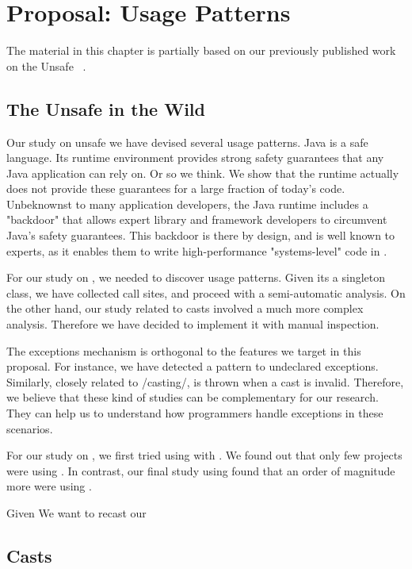 
\chapter{Proposal: Usage Patterns}

\label{cha:proposal}

The material in this chapter is partially based on our previously published work on the Unsafe \api{}~\cite{mastrangelo_use_2015}.

\section{The \java{} Unsafe \api{} in the Wild}

Our study on unsafe we have devised several usage patterns.
Java is a safe language.
Its runtime environment provides strong safety guarantees that any Java application can rely on.
Or so we think.
We show that the runtime actually does not provide these guarantees for a large fraction of today's \java{} code.
Unbeknownst to many application developers, the Java runtime includes a "backdoor" that allows expert library and framework developers to circumvent Java's safety guarantees.
This backdoor is there by design, and is well known to experts, as it enables them to write high-performance "systems-level" code in \java{}.

For our study on \smu{}, we needed to discover usage patterns.
Given its a singleton class, we have collected call sites, and proceed with a semi-automatic analysis.
On the other hand, our study related to casts involved a much more complex analysis.
Therefore we have decided to implement it with manual inspection.

The exceptions mechanism is orthogonal to the features we target in this proposal.
For instance, we have detected a \smu{} pattern to \throw{} undeclared exceptions.
Similarly, closely related to /casting/, \cce{} is thrown when a cast is invalid.
Therefore, we believe that these kind of studies can be complementary for our research.
They can help us to understand how programmers handle exceptions in these scenarios.

For our study on \smu{}, we first tried using \boa{} with \sourceforge{}.
We found out that only few projects were using \smu{}.
In contrast, our final study using \maven{} found that an order of magnitude more were using \smu{}.

Given 
We want to recast our 

\section{Casts}

